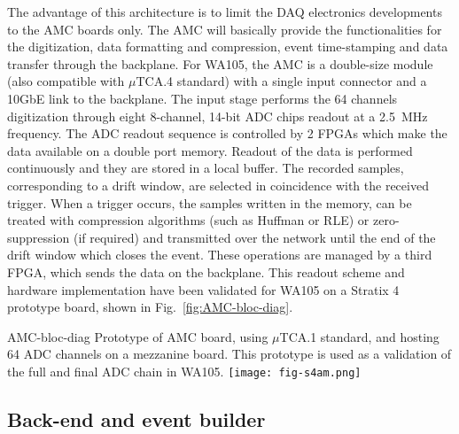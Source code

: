 The advantage of this architecture is to limit the DAQ electronics
developments to the AMC boards only. The AMC will basically provide
the functionalities for the digitization, data formatting and
compression, event time-stamping and data transfer through the
backplane. For WA105, the AMC is a double-size module (also compatible
with $\mu$TCA.4 standard) with a single input connector and a 10GbE
link to the backplane. The input stage performs the 64 channels
digitization through eight 8-channel, 14-bit ADC chips readout at a
2.5~MHz frequency. The ADC readout sequence is controlled by 2 FPGAs
which make the data available on a double port memory. Readout of the
data is performed continuously and they are stored in a local
buffer. The recorded samples, corresponding to a drift window, are
selected in coincidence with the received trigger. When a trigger
occurs, the samples written in the memory, can be treated with
compression algorithms (such as Huffman or RLE) or zero-suppression
(if required) and transmitted over the network until the end of the
drift window which closes the event. These operations are managed by a
third FPGA, which sends the data on the backplane.  This readout
scheme and hardware implementation have been validated for WA105 on a
Stratix 4 prototype board, shown in Fig.~\ref{fig:AMC-bloc-diag}.
\begin{cdrfigure}{AMC-bloc-diag}
{\small Prototype of AMC board, using $\mu$TCA.1 standard, and hosting 
64 ADC channels on a mezzanine board. This prototype is used as a validation 
of the full and final ADC chain in WA105.}
\texttt{[image: fig-s4am.png]}
\end{cdrfigure}

\subsection{Back-end and event builder}


